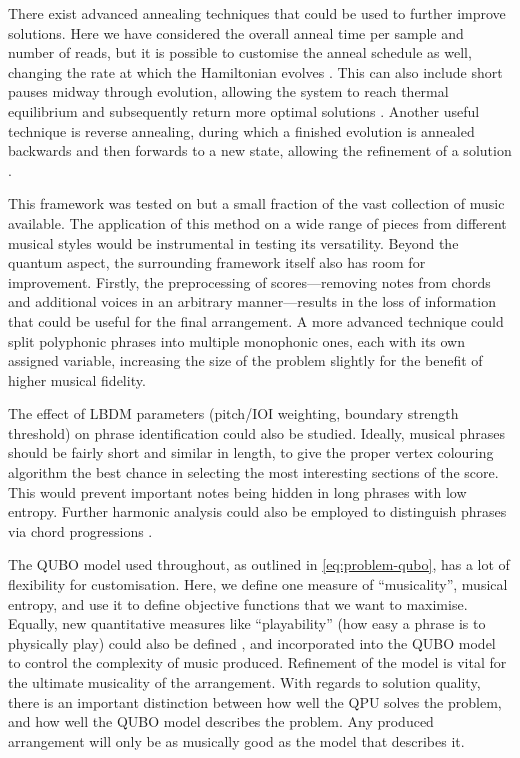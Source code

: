 \documentclass[twocolumn]{article}
\theoremstyle{definition}
\begin{document}
There exist advanced annealing techniques that could be used to further improve solutions. Here we have considered the overall anneal time per sample and number of reads, but it is possible to customise the anneal schedule as well, changing the rate at which the Hamiltonian evolves \cite{khezri_customized_2022}. This can also include short pauses midway through evolution, allowing the system to reach thermal equilibrium and subsequently return more optimal solutions \cite{izquierdo_advantage_2022}. Another useful technique is reverse annealing, during which a finished evolution is annealed backwards and then forwards to a new state, allowing the refinement of a solution \cite{dwave_reverse}.

This framework was tested on but a small fraction of the vast collection of music available. The application of this method on a wide range of pieces from different musical styles would be instrumental in testing its versatility. Beyond the quantum aspect, the surrounding framework itself also has room for improvement. Firstly, the preprocessing of scores---removing notes from chords and additional voices in an arbitrary manner---results in the loss of information that could be useful for the final arrangement. A more advanced technique could split polyphonic phrases into multiple monophonic ones, each with its own assigned variable, increasing the size of the problem slightly for the benefit of higher musical fidelity.

The effect of LBDM parameters (pitch/IOI weighting, boundary strength threshold) on phrase identification could also be studied. Ideally, musical phrases should be fairly short and similar in length, to give the proper vertex colouring algorithm the best chance in selecting the most interesting sections of the score. This would prevent important notes being hidden in long phrases with low entropy. Further harmonic analysis could also be employed to distinguish phrases via chord progressions \cite{huang_towards_2012}.

The QUBO model used throughout, as outlined in \cref{eq:problem-qubo}, has a lot of flexibility for customisation. Here, we define one measure of ``musicality'', musical entropy, and use it to define objective functions that we want to maximise. Equally, new quantitative measures like ``playability'' (how easy a phrase is to physically play) could also be defined \cite{nakamura_statistical_2018}, and incorporated into the QUBO model to control the complexity of music produced. Refinement of the model is vital for the ultimate musicality of the arrangement. With regards to solution quality, there is an important distinction between how well the QPU solves the problem, and how well the QUBO model describes the problem. Any produced arrangement will only be as musically good as the model that describes it.
\end{document}
